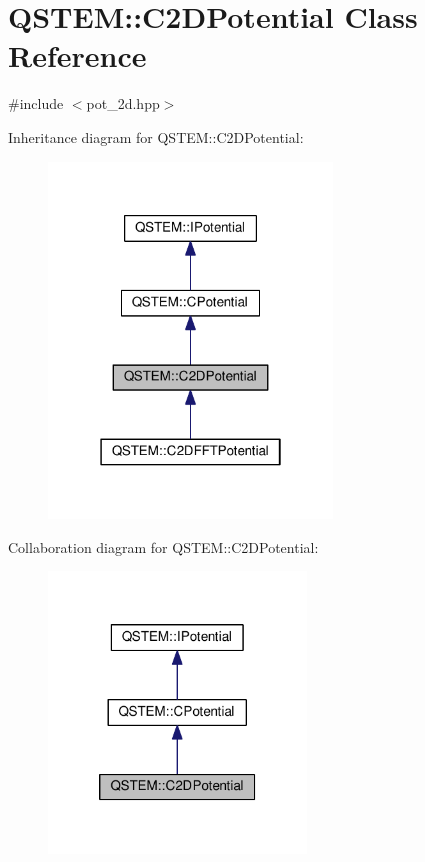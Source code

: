 \hypertarget{class_q_s_t_e_m_1_1_c2_d_potential}{\section{Q\-S\-T\-E\-M\-:\-:C2\-D\-Potential Class Reference}
\label{class_q_s_t_e_m_1_1_c2_d_potential}
}


{\ttfamily \#include $<$pot\-\_\-2d.\-hpp$>$}



Inheritance diagram for Q\-S\-T\-E\-M\-:\-:C2\-D\-Potential\-:
\nopagebreak
\begin{figure}[H]
\begin{center}
\leavevmode
\includegraphics[width=214pt]{class_q_s_t_e_m_1_1_c2_d_potential__inherit__graph}
\end{center}
\end{figure}


Collaboration diagram for Q\-S\-T\-E\-M\-:\-:C2\-D\-Potential\-:
\nopagebreak
\begin{figure}[H]
\begin{center}
\leavevmode
\includegraphics[width=194pt]{class_q_s_t_e_m_1_1_c2_d_potential__coll__graph}
\end{center}
\end{figure}
